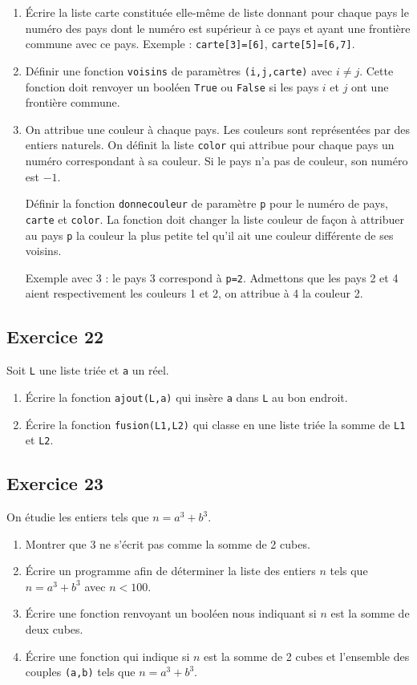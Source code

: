 \documentclass[10pt,fleqn]{article} %
\begin{document}
\begin{multicols}{2}
\begin{enumerate}
\item Écrire la liste carte constituée elle-même de liste donnant pour chaque pays le numéro des pays dont le numéro est supérieur à ce pays et ayant une frontière commune avec ce pays. Exemple : \texttt{carte[3]=[6]}, \texttt{carte[5]=[6,7]}.
\item Définir une fonction \texttt{voisins} de paramètres \texttt{(i,j,carte)} avec $i\neq j$. Cette fonction doit renvoyer un booléen \texttt{True} ou \texttt{False} si les pays $i$ et $j$ ont une frontière commune.
\item On attribue une couleur à chaque pays. Les couleurs sont représentées par des entiers naturels. On définit la liste \texttt{color} qui attribue pour chaque pays un numéro correspondant à sa couleur. Si le pays n'a pas de couleur, son numéro est $-1$. 

Définir la fonction \texttt{donnecouleur} de paramètre \texttt{p} pour le numéro de pays, \texttt{carte} et \texttt{color}. La fonction doit changer la liste couleur de façon à attribuer au pays \texttt{p} la couleur la plus petite tel qu'il ait une couleur différente de ses voisins. 

Exemple avec 3 : le pays 3 correspond à \texttt{p=2}. Admettons que les pays 2 et 4 aient respectivement les couleurs 1 et 2, on attribue à 4 la couleur 2. 
\end{enumerate}

\subsection*{Exercice 22}
Soit \texttt{L} une liste triée et \texttt{a} un réel. 
\begin{enumerate}
\item Écrire la fonction \texttt{ajout(L,a)} qui insère \texttt{a} dans \texttt{L} au bon endroit. 
\item Écrire la fonction \texttt{fusion(L1,L2)} qui classe en une liste triée la somme de \texttt{L1} et \texttt{L2}.
\end{enumerate}



\subsection*{Exercice 23}
On étudie les entiers tels que $n=a^3+b^3$. 
\begin{enumerate}
\item Montrer que $3$ ne s'écrit pas comme la somme de 2 cubes.
\item Écrire un programme afin de déterminer la liste des entiers $n$ tels que $n=a^3+b^3$ avec $n<100$.
\item Écrire une fonction renvoyant un booléen nous indiquant si $n$ est la somme de deux cubes. 
\item Écrire une fonction qui indique si $n$ est la somme de 2 cubes et l'ensemble des couples \texttt{(a,b)} tels que $n=a^3+b^3$.
\end{enumerate}


\end{multicols}
\end{document}
